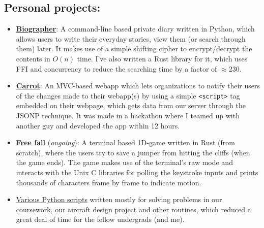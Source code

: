 \documentclass[11pt,a4paper,sans]{moderncv}        %
\newcommand\chref[3][linky]{\href{#2}{\color{#1}#3}}
\begin{document}
\subsection{Personal projects:}
\begin{itemize}
\item \textbf{\chref{https://github.com/Wafflespeanut/biographer}{Biographer}}: A command-line based private diary written in Python, which allows users to write their everyday stories, view them (or search through them) later. It makes use of a simple shifting cipher to encrypt/decrypt the contents in $O(n)$ time. I've also written a Rust library for it, which uses FFI and concurrency to reduce the searching time by a factor of $\approx 230$.
\item \textbf{\chref{https://github.com/joelewis/carrot}{Carrot}}: An MVC-based webapp which lets organizations to notify their users of the changes made to their webapp(s) by using a simple \texttt{<script>} tag embedded on their webpage, which gets data from our server through the JSONP technique. It was made in a hackathon where I teamed up with another guy and developed the app within 12 hours.
\item \textbf{\chref{https://github.com/Wafflespeanut/free-fall}{Free fall}} (\textit{ongoing}): A terminal based 1D-game written in Rust (from scratch), where the users try to save a jumper from hitting the cliffs (when the game ends). The game makes use of the terminal's raw mode and interacts with the Unix C libraries for polling the keystroke inputs and prints thousands of characters frame by frame to indicate motion.
\item \chref{https://github.com/Wafflespeanut/scripts/tree/master/python}{Various Python scripts} written mostly for solving problems in our coursework, our aircraft design project and other routines, which reduced a great deal of time for the fellow undergrads (and me).
\end{itemize}


\end{document}
